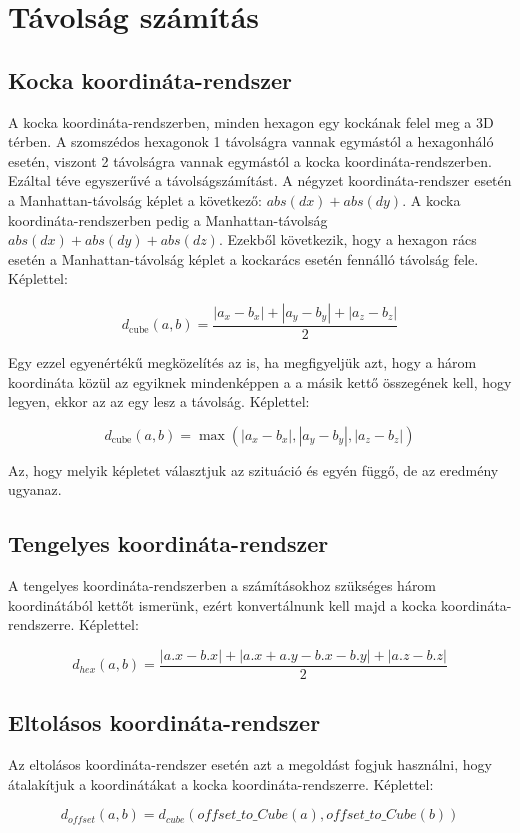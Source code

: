 \section{Távolság számítás}

\subsection{Kocka koordináta-rendszer}

A kocka koordináta-rendszerben, minden hexagon egy kockának felel meg a 3D térben. A szomszédos hexagonok 1 távolságra vannak egymástól a hexagonháló esetén, viszont 2 távolságra vannak egymástól a kocka koordináta-rendszerben. Ezáltal téve egyszerűvé a távolságszámítást. A négyzet koordináta-rendszer esetén a Manhattan-távolság képlet a következő: $abs(dx) + abs(dy)$. A kocka koordináta-rendszerben pedig a Manhattan-távolság $abs(dx) + abs(dy) + abs(dz)$. Ezekből következik, hogy a hexagon rács esetén a Manhattan-távolság képlet a kockarács esetén fennálló távolság fele.
\newline
\newline Képlettel:

$$
d_{\text{cube}}(a, b) =
\dfrac{|a_x - b_x| + |a_y - b_y| + |a_z - b_z|}{2}
$$

\noindent Egy ezzel egyenértékű megközelítés az is, ha megfigyeljük azt, hogy a három koordináta közül az egyiknek mindenképpen a a másik kettő összegének kell, hogy legyen, ekkor az az egy lesz a távolság. 
\newline
\newline Képlettel:

$$
d_{\text{cube}}(a, b) =
\max(
|a_x - b_x|, |a_y - b_y|, |a_z - b_z|
)
$$

\noindent Az, hogy melyik képletet választjuk az szituáció és egyén függő, de az eredmény ugyanaz.

\subsection{Tengelyes koordináta-rendszer}

A tengelyes koordináta-rendszerben a számításokhoz szükséges három koordinátából kettőt ismerünk, ezért konvertálnunk kell majd a kocka koordináta-rendszerre.
\newline
\newline Képlettel:

$$
d_{hex}(a, b) = \frac{|a.x - b.x| + |a.x + a.y - b.x - b.y| + |a.z - b.z|}{2}
$$

\subsection{Eltolásos koordináta-rendszer}

Az eltolásos koordináta-rendszer esetén azt a megoldást fogjuk használni, hogy átalakítjuk a koordinátákat a kocka koordináta-rendszerre.
\newline
\newline Képlettel:

$$
d_{offset} (a, b) = d_{cube}(offset\_to\_Cube(a), offset\_to\_Cube(b)) 
$$

